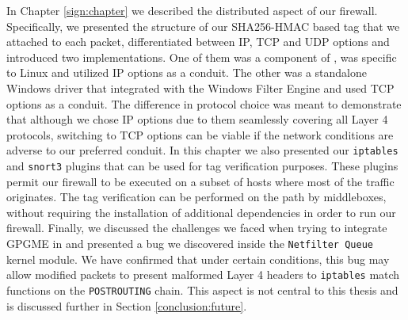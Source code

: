 In Chapter \ref{sign:chapter} we described the distributed aspect of our firewall.
Specifically, we presented the structure of our SHA256-HMAC based tag that we
attached to each packet, differentiated between IP, TCP and UDP options and
introduced two implementations. One of them was a component of \daf{}, was specific
to Linux and utilized IP options as a conduit. The other was a standalone Windows
driver that integrated with the Windows Filter Engine and used TCP options as
a conduit. The difference in protocol choice was meant to demonstrate that
although we chose IP options due to them seamlessly covering all Layer 4
protocols, switching to TCP options can be viable if the network conditions are
adverse to our preferred conduit. In this chapter we also presented our
\texttt{iptables} and \texttt{snort3} plugins that can be used for tag
verification purposes. These plugins permit our firewall to be executed on a
subset of hosts where most of the traffic originates. The tag verification can
be performed on the path by middleboxes, without requiring the installation of
additional dependencies in order to run our firewall. Finally, we discussed the
challenges we faced when trying to integrate GPGME in \daf{} and presented a bug
we discovered inside the \texttt{Netfilter Queue} kernel module. We have
confirmed that under certain conditions, this bug may allow modified packets to
present malformed Layer 4 headers to \texttt{iptables} match functions on the
\texttt{POSTROUTING} chain. This aspect is not central to this thesis and is
discussed further in Section \ref{conclusion:future}.
